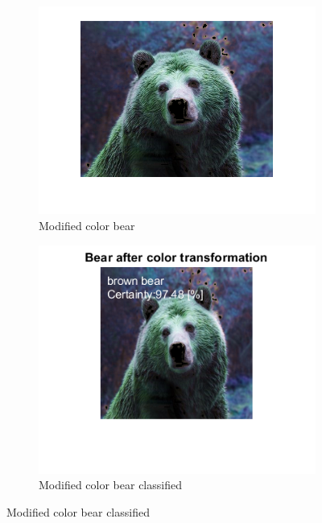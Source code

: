 \documentclass[a4paper]{iacas}
\begin{document}
\begin{figure}
  \begin{subfigure}{0.4\linewidth}
	\includegraphics[width=\linewidth]{imgs/bear_hue.png}
	\caption{Modified color bear}
  \end{subfigure}
  \begin{subfigure}{0.4\linewidth}
	\includegraphics[width=\linewidth]{imgs/bear_hue_classified.png}
	\caption{Modified color bear classified}
  \end{subfigure}


\end{figure}
\end{document}
